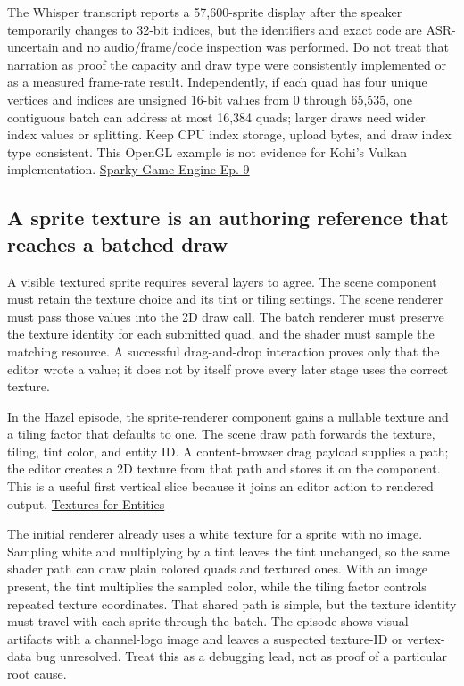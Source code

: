 The Whisper transcript reports a 57,600-sprite display after the speaker temporarily changes to 32-bit indices, but the identifiers and exact code are ASR-uncertain and no audio/frame/code inspection was performed. Do not treat that narration as proof the capacity and draw type were consistently implemented or as a measured frame-rate result. Independently, if each quad has four unique vertices and indices are unsigned 16-bit values from 0 through 65,535, one contiguous batch can address at most 16,384 quads; larger draws need wider index values or splitting. Keep CPU index storage, upload bytes, and draw index type consistent. This OpenGL example is not evidence for Kohi's Vulkan implementation. \href{https://www.youtube.com/watch?v=ImtWD_9OAeY}{Sparky Game Engine Ep. 9}

\subsection{A sprite texture is an authoring reference that reaches a batched draw}\label{06-engine-ii-ch026-a-sprite-texture-is-an-authoring-reference-that-reaches-a-batched-draw}

A visible textured sprite requires several layers to agree. The scene component must retain the texture choice and its tint or tiling settings. The scene renderer must pass those values into the 2D draw call. The batch renderer must preserve the texture identity for each submitted quad, and the shader must sample the matching resource. A successful drag-and-drop interaction proves only that the editor wrote a value; it does not by itself prove every later stage uses the correct texture.

In the Hazel episode, the sprite-renderer component gains a nullable texture and a tiling factor that defaults to one. The scene draw path forwards the texture, tiling, tint color, and entity ID. A content-browser drag payload supplies a path; the editor creates a 2D texture from that path and stores it on the component. This is a useful first vertical slice because it joins an editor action to rendered output. \href{https://www.youtube.com/watch?v=woSa-ZMJl-Q}{Textures for Entities}

The initial renderer already uses a white texture for a sprite with no image. Sampling white and multiplying by a tint leaves the tint unchanged, so the same shader path can draw plain colored quads and textured ones. With an image present, the tint multiplies the sampled color, while the tiling factor controls repeated texture coordinates. That shared path is simple, but the texture identity must travel with each sprite through the batch. The episode shows visual artifacts with a channel-logo image and leaves a suspected texture-ID or vertex-data bug unresolved. Treat this as a debugging lead, not as proof of a particular root cause.


